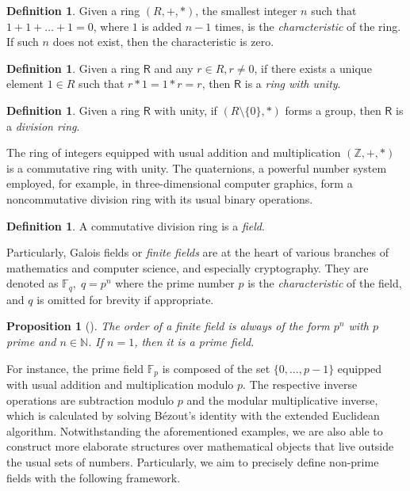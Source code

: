 \documentclass[12pt, a4paper, oneside]{memoir}
\newtheorem{proposition}[theorem]{Proposition}
\theoremstyle{definition}
\newtheorem{definition}[theorem]{Definition}
\begin{document}
\begin{definition}
  Given a ring $(R, +, \ast)$, the smallest integer $n$ such that $1 + 1 + \dots + 1 = 0$, where $1$ is added $n - 1$ times, is the \emph{characteristic} of the ring. If such $n$ does not exist, then the characteristic is zero.
\end{definition}

\begin{definition}
  Given a ring $\mathsf{R}$ and any $r \in R, r \neq 0$, if there exists a unique element $1 \in R$ such that $r \ast 1 = 1 \ast r = r$, then $\mathsf{R}$ is a \emph{ring with unity}.
\end{definition}

\begin{definition}
  Given a ring $\mathsf{R}$ with unity, if $(R \setminus \{0\}, \ast)$ forms a group, then $\mathsf{R}$ is a \emph{division ring}.
\end{definition}

The ring of integers equipped with usual addition and multiplication $(\mathbb{Z}, +, \ast)$ is a commutative ring with unity. The quaternions, a powerful number system employed, for example, in three-dimensional computer graphics, form a noncommutative division ring with its usual binary operations.

\begin{definition}
  A commutative division ring is a \emph{field}.
\end{definition}

Particularly, Galois fields or \emph{finite fields} are at the heart of various branches of mathematics and computer science, and especially cryptography. They are denoted as $\mathbb{F}_{q},\; q = p^{n}$ where the prime number $p$ is the \emph{characteristic} of the field, and $q$ is omitted for brevity if appropriate.

\begin{proposition}[{\cite[Corollary 2.18]{Mullen:2013}}]
  The order of a finite field is always of the form $p^{n}$ with $p$ prime and $n \in \mathbb{N}$. If $n = 1$, then it is a \emph{prime field}.
\end{proposition}

For instance, the prime field $\mathbb{F}_{p}$ is composed of the set $\{0, \dots, p - 1\}$ equipped with usual addition and multiplication modulo $p$. The respective inverse operations are subtraction modulo $p$ and the modular multiplicative inverse, which is calculated by solving Bézout's identity with the extended Euclidean algorithm. Notwithstanding the aforementioned examples, we are also able to construct more elaborate structures over mathematical objects that live outside the usual sets of numbers. Particularly, we aim to precisely define non-prime fields with the following framework.
\end{document}
